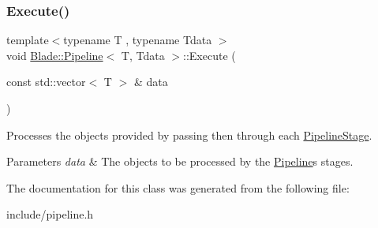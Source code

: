\subsubsection{\texorpdfstring{Execute()}{Execute()}}
{\footnotesize\ttfamily template$<$typename T , typename Tdata $>$ \\
void \hyperlink{class_blade_1_1_pipeline}{Blade\+::\+Pipeline}$<$ T, Tdata $>$\+::Execute (\begin{DoxyParamCaption}\item[{const std\+::vector$<$ T $>$ \&}]{data }\end{DoxyParamCaption})\hspace{0.3cm}{\ttfamily [inline]}}



Processes the objects provided by passing then through each \hyperlink{class_blade_1_1_pipeline_stage}{Pipeline\+Stage}. 


\begin{DoxyParams}{Parameters}
{\em data} & The objects to be processed by the \hyperlink{class_blade_1_1_pipeline}{Pipeline}\textquotesingle{}s stages. \\
\hline
\end{DoxyParams}


The documentation for this class was generated from the following file\+:\begin{DoxyCompactItemize}
\item 
include/pipeline.\+h\end{DoxyCompactItemize}
